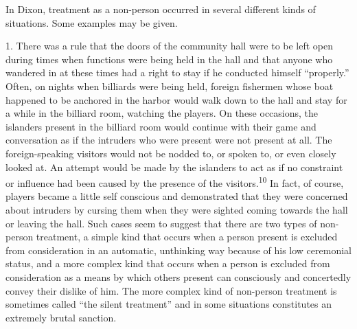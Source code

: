 \documentclass[openany,nobib]{tufte-book}
\begin{document}
In Dixon, treatment as a non-person occurred in several different kinds
of situations. Some examples may be given.

\enlargethispage{\baselineskip}

1. There was a rule that the doors of the community hall were to be left
open during times when functions were being held in the hall and that
anyone who wandered in at these times had a right to stay if he
conducted himself ``properly.'' Often, on nights when billiards were
being held, foreign fishermen whose boat happened to be anchored in the
harbor would walk down to the hall and stay for a while in the billiard
room, watching the players. On these occasions, the islanders present in
the billiard room would continue with their game and conversation as if
the intruders who were present were not present at all. The
foreign-speaking visitors would not be nodded to, or spoken to, or even
closely looked at. An attempt would be made by the islanders to act as
if no constraint or influence had been caused by the presence of the
visitors.\textsuperscript{10} In fact, of course,
players became a little self conscious and demonstrated that they were
concerned about intruders by cursing them when they were sighted coming
towards the hall or leaving the hall. Such cases seem to suggest that
there are two types of non-person treatment, a simple kind that occurs
when a person present is excluded from consideration in an automatic,
unthinking way because of his low ceremonial status, and a more complex
kind that occurs when a person is excluded from consideration as a means
by which others present can consciously and concertedly convey their
dislike of him. The more complex kind of non-person treatment is
sometimes called ``the silent treatment'' and in some situations
constitutes an extremely brutal sanction.
\end{document}
